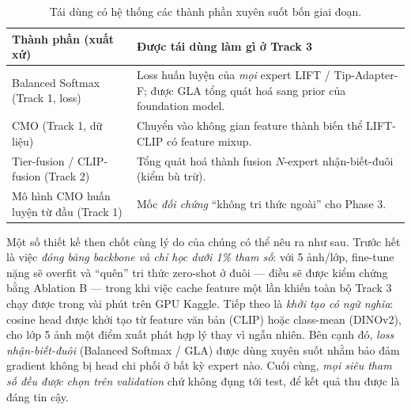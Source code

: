 \begin{table}[H]
\centering
\caption{Tái dùng có hệ thống các thành phần xuyên suốt bốn giai đoạn.}
\label{tab:reuse}
\begin{tabular}{p{4.2cm} p{8.6cm}}
\toprule
\textbf{Thành phần (xuất xứ)} & \textbf{Được tái dùng làm gì ở Track 3} \\
\midrule
Balanced Softmax (Track 1, loss) & Loss huấn luyện của \emph{mọi} expert LIFT / Tip-Adapter-F; được
GLA tổng quát hoá sang prior của foundation model. \\
CMO (Track 1, dữ liệu) & Chuyển vào không gian feature thành biến thể LIFT-CLIP có feature mixup. \\
Tier-fusion / CLIP-fusion (Track 2) & Tổng quát hoá thành fusion $N$-expert nhận-biết-đuôi (kiểm bù trừ). \\
Mô hình CMO huấn luyện từ đầu (Track 1) & Mốc \emph{đối chứng} ``không tri thức ngoài'' cho Phase 3. \\
\bottomrule
\end{tabular}
\end{table}

Một số thiết kế then chốt cùng lý do của chúng có thể nêu ra như sau. Trước hết là việc
\emph{đóng băng backbone và chỉ học dưới 1\% tham số}: với 5 ảnh/lớp, fine-tune nặng sẽ overfit và
``quên'' tri thức zero-shot ở đuôi --- điều sẽ được kiểm chứng bằng Ablation B --- trong khi việc
cache feature một lần khiến toàn bộ Track 3 chạy được trong vài phút trên GPU Kaggle. Tiếp theo là
\emph{khởi tạo có ngữ nghĩa}: cosine head được khởi tạo từ feature văn bản (CLIP) hoặc class-mean
(DINOv2), cho lớp 5 ảnh một điểm xuất phát hợp lý thay vì ngẫu nhiên. Bên cạnh đó, \emph{loss
nhận-biết-đuôi} (Balanced Softmax / GLA) được dùng xuyên suốt nhằm bảo đảm gradient không bị head
chi phối ở bất kỳ expert nào. Cuối cùng, \emph{mọi siêu tham số đều được chọn trên validation} chứ
không đụng tới test, để kết quả thu được là đáng tin cậy.
